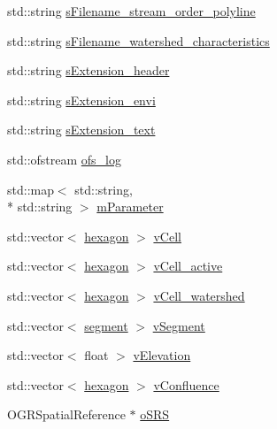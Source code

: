 \begin{DoxyCompactItemize}
std\-::string \hyperlink{classhexwatershed_1_1domain_a7dc757b3f0ce86808ab7e2c2ae7a5eb6}{s\-Filename\-\_\-stream\-\_\-order\-\_\-polyline}
\item 
std\-::string \hyperlink{classhexwatershed_1_1domain_a951d721abfc639a301a0834231c1bf5d}{s\-Filename\-\_\-watershed\-\_\-characteristics}
\item 
std\-::string \hyperlink{classhexwatershed_1_1domain_a165e26b5807eac0f5cd19ef907fe569b}{s\-Extension\-\_\-header}
\item 
std\-::string \hyperlink{classhexwatershed_1_1domain_ab72b24c88c3eaef574931c2d653ee514}{s\-Extension\-\_\-envi}
\item 
std\-::string \hyperlink{classhexwatershed_1_1domain_a24e3c79deec7127a752885357cc60e3d}{s\-Extension\-\_\-text}
\item 
std\-::ofstream \hyperlink{classhexwatershed_1_1domain_a17de82513fa3f9838ea499e8328d52ab}{ofs\-\_\-log}
\item 
std\-::map$<$ std\-::string, \\*
std\-::string $>$ \hyperlink{classhexwatershed_1_1domain_ad819d11f40db09883ade5c0ad020b521}{m\-Parameter}
\item 
std\-::vector$<$ \hyperlink{classhexwatershed_1_1hexagon}{hexagon} $>$ \hyperlink{classhexwatershed_1_1domain_a335b042f837bb1d5bf6494e1b28ce502}{v\-Cell}
\item 
std\-::vector$<$ \hyperlink{classhexwatershed_1_1hexagon}{hexagon} $>$ \hyperlink{classhexwatershed_1_1domain_ae83f1884f6afd8f5a98848e93f3507ea}{v\-Cell\-\_\-active}
\item 
std\-::vector$<$ \hyperlink{classhexwatershed_1_1hexagon}{hexagon} $>$ \hyperlink{classhexwatershed_1_1domain_a5087da3221f695d12d0659d779e41e2c}{v\-Cell\-\_\-watershed}
\item 
std\-::vector$<$ \hyperlink{classhexwatershed_1_1segment}{segment} $>$ \hyperlink{classhexwatershed_1_1domain_ac4d3bbe063870f14c2c2560e43c8d01a}{v\-Segment}
\item 
std\-::vector$<$ float $>$ \hyperlink{classhexwatershed_1_1domain_a534b3cf5bff1f923373c187ca9d0db08}{v\-Elevation}
\item 
std\-::vector$<$ \hyperlink{classhexwatershed_1_1hexagon}{hexagon} $>$ \hyperlink{classhexwatershed_1_1domain_a7fe968d507aa3f6225f2890b1ed12ff0}{v\-Confluence}
\item 
O\-G\-R\-Spatial\-Reference $\ast$ \hyperlink{classhexwatershed_1_1domain_acb7ef4a40c805b9a986eb977059a5cd3}{o\-S\-R\-S}
\end{DoxyCompactItemize}


